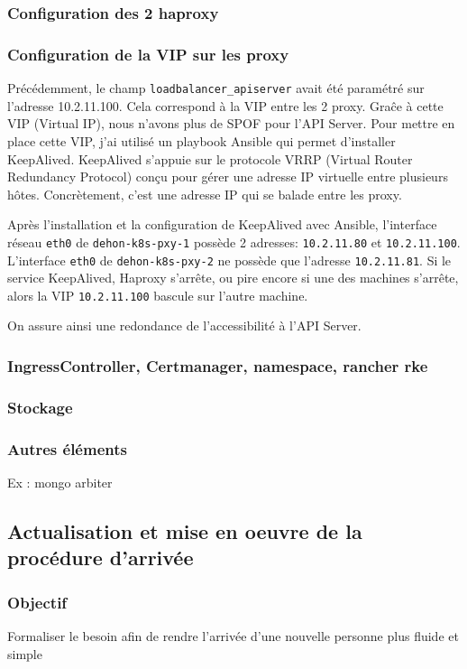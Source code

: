 \documentclass[12pt]{article}
\begin{document}
\subsubsection{Configuration des 2 haproxy}

\subsubsection{Configuration de la VIP sur les proxy}
Précédemment, le champ \verb|loadbalancer_apiserver| avait été paramétré sur l'adresse 10.2.11.100.
Cela correspond à la VIP entre les 2 proxy.
Graĉe à cette VIP (Virtual IP), nous n'avons plus de SPOF pour l'API Server.
Pour mettre en place cette VIP, j'ai utilisé un playbook Ansible qui permet d'installer KeepAlived.
KeepAlived s'appuie sur le protocole VRRP (Virtual Router Redundancy Protocol) conçu pour gérer une adresse IP virtuelle entre plusieurs hôtes.
Concrètement, c'est une adresse IP qui se balade entre les proxy.

Après l'installation et la configuration de KeepAlived avec Ansible, l'interface réseau \verb|eth0| de \verb|dehon-k8s-pxy-1| possède 2 adresses: \verb|10.2.11.80| et \verb|10.2.11.100|.
L'interface \verb|eth0| de \verb|dehon-k8s-pxy-2| ne possède que l'adresse \verb|10.2.11.81|.
Si le service KeepAlived, Haproxy s'arrête, ou pire encore si une des machines s'arrête, alors la VIP \verb|10.2.11.100| bascule sur l'autre machine.

On assure ainsi une redondance de l'accessibilité à l'API Server.


\subsubsection{IngressController, Certmanager, namespace, rancher rke}
\subsubsection{Stockage}
\subsubsection{Autres éléments}
Ex : mongo arbiter

\newpage
\subsection{Actualisation et mise en oeuvre de la procédure d'arrivée}
\subsubsection{Objectif}
Formaliser le besoin afin de rendre l'arrivée d'une nouvelle personne plus fluide et simple
\end{document}
